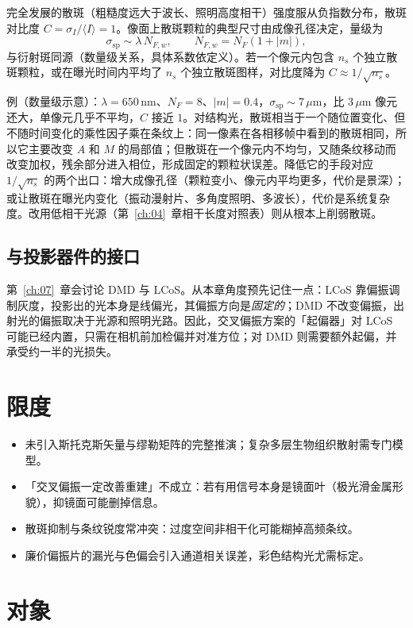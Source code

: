 完全发展的散斑（粗糙度远大于波长、照明高度相干）强度服从负指数分布，散斑对比度 $C=\sigma_I/\langle I\rangle=1$。像面上散斑颗粒的典型尺寸由成像孔径决定，量级为
\[
  \sigma_{\mathrm{sp}}\sim\lambda\,N_{F,w},\qquad N_{F,w}=N_F(1+|m|),
\]
与衍射斑同源（数量级关系，具体系数依定义）。若一个像元内包含 $n_s$ 个独立散斑颗粒，或在曝光时间内平均了 $n_s$ 个独立散斑图样，对比度降为 $C\approx1/\sqrt{n_s}$。

例（数量级示意）：$\lambda=650\,\mathrm{nm}$、$N_F=8$、$|m|=0.4$，$\sigma_{\mathrm{sp}}\sim7\,\mu\mathrm{m}$，比 $3\,\mu\mathrm{m}$ 像元还大，单像元几乎不平均，$C$ 接近 $1$。对结构光，散斑相当于一个随位置变化、但不随时间变化的乘性因子乘在条纹上：同一像素在各相移帧中看到的散斑相同，所以它主要改变 $A$ 和 $M$ 的局部值；但散斑在一个像元内不均匀，又随条纹移动而改变加权，残余部分进入相位，形成固定的颗粒状误差。降低它的手段对应 $1/\sqrt{n_s}$ 的两个出口：增大成像孔径（颗粒变小、像元内平均更多，代价是景深）；或让散斑在曝光内变化（振动漫射片、多角度照明、多波长），代价是系统复杂度。改用低相干光源（第~\ref{ch:04}~章相干长度对照表）则从根本上削弱散斑。

\subsection{与投影器件的接口}

第~\ref{ch:07}~章会讨论 DMD 与 LCoS。从本章角度预先记住一点：LCoS 靠偏振调制灰度，投影出的光本身是线偏光，其偏振方向是\emph{固定的}；DMD 不改变偏振，出射光的偏振取决于光源和照明光路。因此，交叉偏振方案的「起偏器」对 LCoS 可能已经内置，只需在相机前加检偏并对准方位；对 DMD 则需要额外起偏，并承受约一半的光损失。

\section{限度}
\label{sec:ch04-limits}

\begin{itemize}
  \item 未引入斯托克斯矢量与缪勒矩阵的完整推演；复杂多层生物组织散射需专门模型。
  \item 「交叉偏振一定改善重建」不成立：若有用信号本身是镜面叶（极光滑金属形貌），抑镜面可能删掉信息。
  \item 散斑抑制与条纹锐度常冲突：过度空间非相干化可能糊掉高频条纹。
  \item 廉价偏振片的漏光与色偏会引入通道相关误差，彩色结构光尤需标定。
\end{itemize}

\section{对象}
\label{sec:ch04-object}

